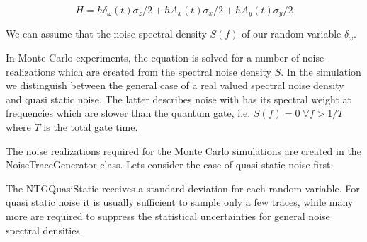 \documentclass[letterpaper,10pt,english]{sphinxmanual}
\begin{document}
\begin{equation}
H = \hbar \delta_\omega (t) \sigma_z / 2 + \hbar A_x (t) \sigma_x / 2
+ \hbar A_y(t) \sigma_y / 2
\end{equation}

We can assume that the noise spectral density \(S(f)\) of our random variable \(\delta_\omega\).

In Monte Carlo experiments, the equation is solved for a number of noise realizations which are created from the spectral noise density \(S\). In the simulation we distinguish between the general case of a real valued spectral noise density and quasi static noise. The latter describes noise with has its spectral weight at frequencies which are slower than the quantum gate, i.e. \(S(f) = 0 \; \forall f > 1/T\) where \(T\) is the total gate time.

The noise realizations required for the Monte Carlo simulations are created in the NoiseTraceGenerator class. Lets consider the case of quasi static noise first:

{
\begin{sphinxVerbatim}[commandchars=\\\{\}]
\llap{\color{nbsphinxin}[1]:\,\hspace{\fboxrule}\hspace{\fboxsep}}   

  
    \PYG{p}{[}\PYG{p}{]}
\end{sphinxVerbatim}
}

The NTGQuasiStatic receives a standard deviation for each random variable. For quasi static noise it is usually sufficient to sample only a few traces, while many more are required to suppress the statistical uncertainties for general noise spectral densities.
\end{document}
